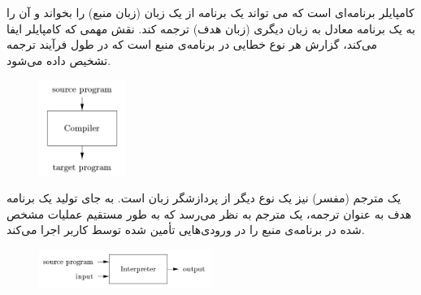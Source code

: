 \documentclass{article}
\begin{document}


\newpage


\section{}%


\section{}%

کامپایلر برنامه‌ای است که می تواند یک برنامه از یک زبان (زبان منبع) را بخواند و آن را به یک برنامه معادل به زبان دیگری (زبان هدف) ترجمه کند. نقش مهمی که کامپایلر ایفا می‌کند، گزارش هر نوع خطایی در برنامه‌ی منبع است که در طول فرآیند ترجمه تشخیص داده می‌شود.
\begin{figure}[H]
    \centering
    \includegraphics[width=0.25\textwidth]{figures/2a.png}
    \caption
	{}
    \label{fig:fig1}
\end{figure}
یک مترجم (مفسر) نیز یک نوع دیگر از پردازشگر زبان است. به جای تولید یک برنامه هدف به عنوان ترجمه، یک مترجم به نظر می‌رسد که به طور مستقیم عملیات مشخص شده در برنامه‌ی منبع را در ورودی‌هایی تأمین شده توسط کاربر اجرا می‌کند.
\begin{figure}[H]
    \centering
    \includegraphics[width=0.5\textwidth]{figures/2b.png}
    \caption
	{}
    \label{fig:fig1}
\end{figure}
\end{document}
